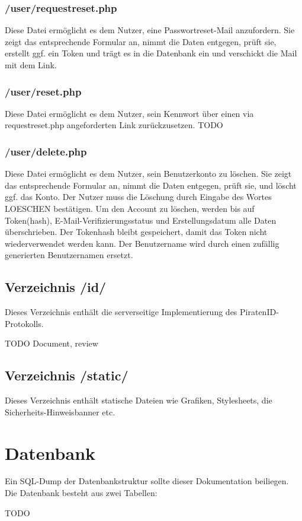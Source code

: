 \documentclass[parskip=half]{scrartcl}
\begin{document}
\subsubsection{/user/requestreset.php}
Diese Datei ermöglicht es dem Nutzer, eine Passwortreset-Mail anzufordern.
Sie zeigt das entsprechende Formular an, nimmt die Daten entgegen, prüft sie, erstellt ggf. ein Token und trägt es in die Datenbank ein und verschickt die Mail mit dem Link.

\subsubsection{/user/reset.php}
Diese Datei ermöglicht es dem Nutzer, sein Kennwort über einen via requestreset.php angeforderten Link zurückzusetzen.
TODO

\subsubsection{/user/delete.php}
Diese Datei ermöglicht es dem Nutzer, sein Benutzerkonto zu löschen.
Sie zeigt das entsprechende Formular an, nimmt die Daten entgegen, prüft sie, und löscht ggf. das Konto.
Der Nutzer muss die Löschung durch Eingabe des Wortes LOESCHEN bestätigen.
Um den Account zu löschen, werden bis auf Token(hash), E-Mail-Verifizierungsstatus und Erstellungsdatum alle Daten überschrieben.
Der Tokenhash bleibt gespeichert, damit das Token nicht wiederverwendet werden kann.
Der Benutzername wird durch einen zufällig generierten Benutzernamen ersetzt.

\subsection{Verzeichnis /id/}
Dieses Verzeichnis enthält die serverseitige Implementierung des PiratenID-Protokolls.

TODO Document, review



\subsection{Verzeichnis /static/}
Dieses Verzeichnis enthält statische Dateien wie Grafiken, Stylesheets, die Sicherheits-Hinweisbanner etc.


\section{Datenbank}
Ein SQL-Dump der Datenbankstruktur sollte dieser Dokumentation beiliegen.
Die Datenbank besteht aus zwei Tabellen:

TODO
\end{document}
